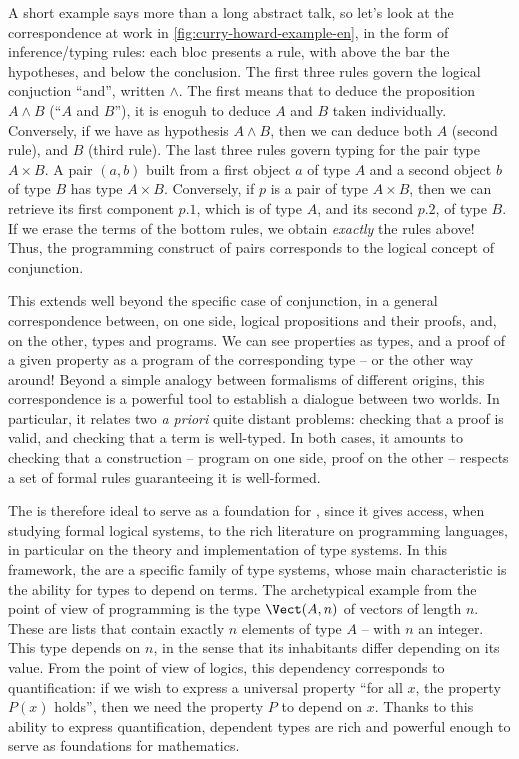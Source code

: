 A short example says more than a long abstract talk, so let’s look at the correspondence
at work in \cref{fig:curry-howard-example-en}, in the form of inference/typing rules:
each bloc presents a rule, with above the bar the hypotheses, and below the conclusion.
The first three rules govern the logical conjuction “and”, written $\wedge$.
The first means that to deduce the proposition $A \wedge B$ (“$A$ and $B$”), it is enoguh
to deduce $A$ and $B$ taken individually.
Conversely, if we have as hypothesis $A \wedge B$, then we can deduce both $A$ (second rule),
and $B$ (third rule).
The last three rules govern typing%
for the pair type $A \times B$. A pair $(a,b)$ built
from a first object $a$ of type $A$ and a second object $b$ of type $B$ has type $A \times B$.
Conversely, if $p$ is a pair of type $A \times B$, then we can retrieve its first component
$p.1$, which is of type $A$, and its second $p.2$, of type $B$.
If we erase the terms%
of the bottom rules, we obtain \emph{exactly} the rules above!
Thus, the programming construct of pairs corresponds to the logical concept of conjunction.

This extends well beyond the specific case of conjunction, in a general correspondence
between, on one side, logical propositions and their proofs, and, on the other, types and programs.
We can see properties as types, and a proof of a given property as a program of the
corresponding type – or the other way around!
Beyond a simple analogy between formalisms of different origins, this correspondence
is a powerful tool to establish a dialogue between two worlds. In particular, it
relates two \textit{a priori} quite distant problems: checking that a proof
is valid, and checking that a term is well-typed. In both cases, it amounts to checking that
a construction – program on one side, proof on the other – respects a set of formal
rules guaranteeing it is well-formed.

The  is therefore ideal to serve as a foundation for
, since it gives access, when studying formal logical systems,
to the rich literature on programming languages, in particular on the theory and
implementation of type systems. In this framework, the
 are a specific family of type systems,
whose main characteristic is the ability for types to depend on terms. The archetypical
example from the point of view of programming is the type $\Vect(A,n)$
of vectors of length $n$. These are lists that contain exactly $n$ elements of type $A$ – with
$n$ an integer.
This type depends on $n$, in the sense that its inhabitants differ depending on its value.
From the point of view of logics, this dependency corresponds to quantification: if we
wish to express a universal property “for all $x$, the property $P(x)$ holds”, then we need
the property $P$ to depend on $x$.
Thanks to this ability to express quantification, dependent types are rich and powerful enough
to serve as foundations for mathematics.

